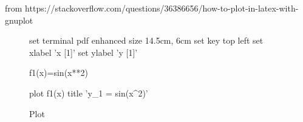 \documentclass{article}
\begin{document}




from https://stackoverflow.com/questions/36386656/how-to-plot-in-latex-with-gnuplot


\begin{figure}[h]
	\centering
	\begin{gnuplot}[terminal=pdf]
		set terminal pdf enhanced size 14.5cm, 6cm
		set key top left
		set xlabel 'x [1]'
		set ylabel 'y [1]'
		
		f1(x)=sin(x**2)
		
		plot f1(x) title 'y_1 = sin(x^2)'
	\end{gnuplot}
	\caption{Plot}
\end{figure}
\end{document}
